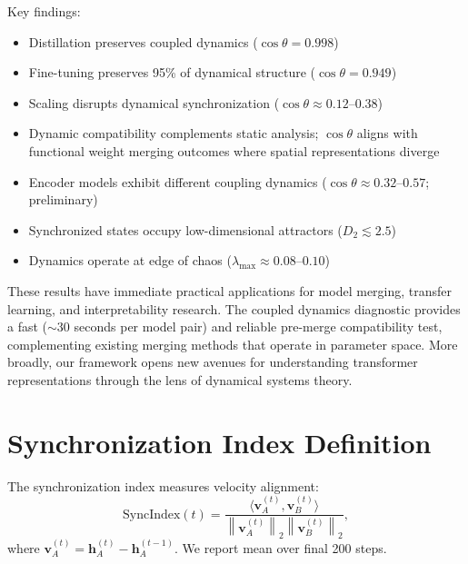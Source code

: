 \documentclass[10pt]{article} %
\theoremstyle{plain}
\theoremstyle{definition}
\theoremstyle{remark}
\newcommand{\norm}[1]{\left\lVert#1\right\rVert}
\newcommand{\inner}[2]{\langle #1, #2 \rangle}
\newcommand{\vect}[1]{\bm{#1}}
\begin{document}
Key findings:
\begin{itemize}
    \item Distillation preserves coupled dynamics ($\cos \theta = 0.998$)
    \item Fine-tuning preserves 95\% of dynamical structure ($\cos \theta = 0.949$)
    \item Scaling disrupts dynamical synchronization ($\cos \theta \approx 0.12$--$0.38$)
    \item Dynamic compatibility complements static analysis; $\cos \theta$ aligns with functional weight merging outcomes where spatial representations diverge
    \item Encoder models exhibit different coupling dynamics ($\cos \theta \approx 0.32$--$0.57$; preliminary)
    \item Synchronized states occupy low-dimensional attractors ($D_2 \lesssim 2.5$)
    \item Dynamics operate at edge of chaos ($\lambda_{\max} \approx 0.08$--$0.10$)
\end{itemize}

These results have immediate practical applications for model merging, transfer learning, and interpretability research. The coupled dynamics diagnostic provides a fast ($\sim$30 seconds per model pair) and reliable pre-merge compatibility test, complementing existing merging methods that operate in parameter space. More broadly, our framework opens new avenues for understanding transformer representations through the lens of dynamical systems theory.




\appendix

\section{Synchronization Index Definition}

The synchronization index measures velocity alignment:
\begin{equation}
    \text{SyncIndex}(t) = \frac{\inner{\vect{v}_A^{(t)}}{\vect{v}_B^{(t)}}}{\norm{\vect{v}_A^{(t)}}_2 \norm{\vect{v}_B^{(t)}}_2},
\end{equation}
where $\vect{v}_A^{(t)} = \vect{h}_A^{(t)} - \vect{h}_A^{(t-1)}$. We report mean over final 200 steps.
\end{document}

